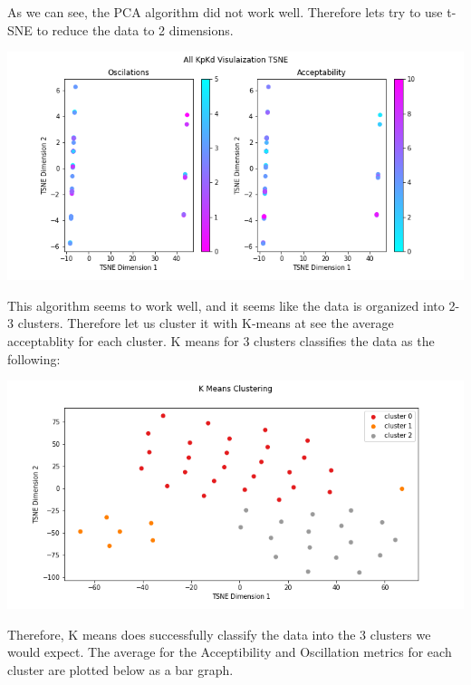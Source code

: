 \documentclass[12pt]{article}
\begin{document}
\begin{multicols}{2}
\begin{center}
\end{center}
As we can see, the PCA algorithm did not work well. Therefore lets try to use t-SNE to reduce the data to 2 dimensions.
\begin{center}
    \includegraphics*[scale=0.3]{KpKiAllTSNE.png}
\end{center}
This algorithm seems to work well, and it seems like the data is organized into 2-3 clusters. Therefore let us cluster 
it with K-means at see the average acceptablity for each cluster. K means for 3 clusters classifies the data as the following:
\begin{center}
    \includegraphics*[scale=0.3]{KpKiAllTSNEKMeans.png}
\end{center}
Therefore, K means does successfully classify the data into the 3 clusters we would expect. The average for the Acceptibility and 
Oscillation metrics for each cluster are plotted below as a bar graph. 
\begin{center}

\end{center}
\end{multicols}
\end{document}
